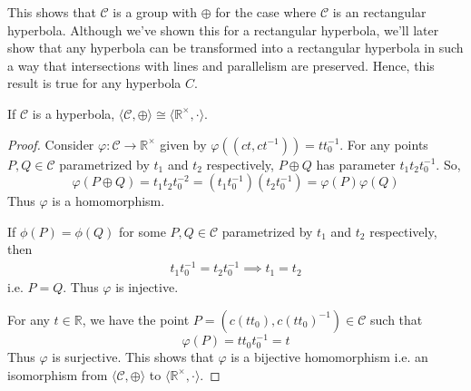 \noindent
This shows that $\mathcal{C}$ is a group with $\oplus$ for the case where
$\mathcal{C}$ is an rectangular hyperbola. Although we've shown this for a
rectangular hyperbola, we'll later show that any hyperbola can be transformed into
a rectangular hyperbola in such a way that intersections with lines and
parallelism are preserved. Hence, this result is true for any hyperbola $C$.

\begin{theorem}
    If $\mathcal{C}$ is a hyperbola,
    $\langle \mathcal{C},\oplus \rangle \cong \langle \mathbb{R}^\times,\cdot \rangle$.
\end{theorem}

\begin{proof}
    Consider $\varphi:\mathcal{C} \to \mathbb{R}^\times$ given by
    $\varphi((ct,ct^{-1})) = t t_0^{-1}$. For any points
    $P,Q\in\mathcal{C}$ parametrized by $t_1$ and $t_2$ respectively,
    $P \oplus Q$ has parameter $t_1 t_2 t_0^{-1}$. So,
    \[
        \varphi(P \oplus Q) = t_1 t_2 t_0^{-2} = (t_1 t_0^{-1}) (t_2 t_0^{-1})
        = \varphi(P) \varphi(Q)
    \]
    Thus $\varphi$ is a homomorphism.
    \vspace{1ex}

    \noindent
    If $\phi(P)=\phi(Q)$ for some $P,Q\in\mathcal{C}$ parametrized by $t_1$ and
    $t_2$ respectively, then
    \begin{align*}
        t_1 t_0^{-1} = t_2 t_0^{-1} \implies t_1 = t_2
    \end{align*}
    i.e. $P=Q$. Thus $\varphi$ is injective.
    \vspace{1ex}

    \noindent
    For any $t \in \mathbb{R}$, we have the point
    $P=(c (t t_0),c (t t_0)^{-1}) \in \mathcal{C}$ such that
    \[ \varphi(P) = t t_0 t_0^{-1} = t \]
    Thus $\varphi$ is surjective. This shows that $\varphi$ is a bijective
    homomorphism i.e. an isomorphism from $\langle \mathcal{C},\oplus \rangle$ to
    $\langle \mathbb{R}^\times,\cdot \rangle$.
\end{proof}
